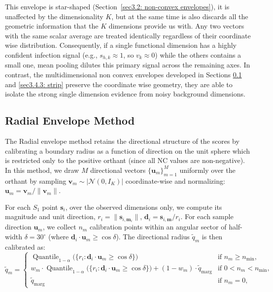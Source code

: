 This envelope is star-shaped (Section~\ref{sec3.2: non-convex envelopes}), it is unaffected by the dimensionality 
$K$, but at the same time is also discards all the geometric information that the $K$ dimensions provide us with. 
Any two vectors with the same scalar average are treated identically regardless of their coordinate wise distribution. 
Consequently, if a single functional dimension has a highly confident infection signal (e.g., $s_{h,k} \approx 1$, so 
$v_k \approx 0$) while the others contains a small one, mean pooling dilutes this primary signal across 
the remaining axes. In contrast, the multidimensional non convex envelopes developed in Sections \ref{sec3.4.2: radial} 
and \ref{sec3.4.3: strip} preserve the coordinate wise geometry, they are able to isolate the strong single dimension 
evidence from noisy background dimensions.



\subsection{Radial Envelope Method}
\label{sec3.4.2: radial}
The Radial envelope method retains the directional structure of the scores by calibrating a boundary radius as a 
function of direction on the unit sphere which is restricted only to the positive orthant (since all NC values are 
non-negative). In this method, we draw $M$ directional vectors $\{\mathbf{u}_m\}_{m=1}^M$ uniformly over the orthant by 
sampling $\mathbf{v}_m \sim |\mathcal{N}(0, I_K)|$ coordinate-wise and normalizing: $\mathbf{u}_m = \mathbf{v}_m / \|
\mathbf{v}_m\|$.

For each $S_1$ point $\mathbf{s}_i$, over the observed dimensions only, we compute its magnitude and unit direction, 
$r_i = \|\mathbf{s}_{i,\mathbf{m}_i}\|$, $\mathbf{d}_i = \mathbf{s}_{i,\mathbf{m}}/r_i$. For each sample direction 
$\mathbf{u}_m$, we collect $n_m$ calibration points within an angular sector of half-width $\delta = 30^\circ$ (where 
$\mathbf{d}_i \cdot \mathbf{u}_m \ge \cos\delta$). The directional radius $\tilde{q}_m$ is then calibrated as:
\begin{equation*}
\tilde{q}_m = \begin{cases}
\operatorname{Quantile}_{1-\alpha}\big(\{r_i : \mathbf{d}_i \cdot \mathbf{u}_m \ge \cos\delta\}\big) & \text{if } 
n_m \ge n_{\min}, \\
w_m \cdot \operatorname{Quantile}_{1-\alpha}\big(\{r_i : \mathbf{d}_i \cdot \mathbf{u}_m \ge \cos\delta\}\big) + 
(1-w_m) \cdot \tilde{q}_{\text{marg}} & \text{if } 0 < n_m < n_{\min}, \\
\tilde{q}_{\text{marg}} & \text{if } n_m = 0,
\end{cases}
\end{equation*}

